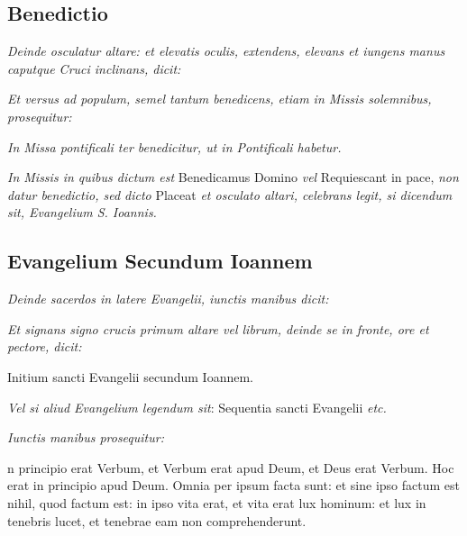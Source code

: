 \subsection{Benedictio}

\textit{%
    Deinde osculatur altare: et elevatis oculis, extendens, elevans et iungens
    manus caputque Cruci inclinans, dicit:
}


\textit{%
    Et versus ad populum, semel tantum benedicens, etiam in Missis solemnibus,
    prosequitur:
}


\divisio

\textit{In Missa pontificali ter benedicitur, ut in Pontificali habetur.}

\textit{In Missis in quibus dictum est} Benedicamus Domino \textit{vel}
Requiescant in pace, \textit{non datur benedictio, sed dicto} Placeat \textit{et
osculato altari, celebrans legit, si dicendum sit, Evangelium S. Ioannis.}

\divisio

\subsection{Evangelium Secundum Ioannem}


\textit{Deinde sacerdos in latere Evangelii, iunctis manibus dicit:}


\textit{%
    Et signans signo crucis primum altare vel librum, deinde se in fronte, ore
    et pectore, dicit:
}

{{\liturgicalfont\fontsize{48}{48}\selectfont\raisebox{-0.3em}{᛭}}}
Initium sancti Evangelii secundum Ioannem.

\textit{Vel si aliud Evangelium legendum sit}: Sequentia sancti Evangelii
\textit{etc.}


\textit{Iunctis manibus prosequitur:}


n principio erat Verbum, et Verbum erat apud Deum, et Deus erat
Verbum.  Hoc erat in principio apud Deum.  Omnia per ipsum facta sunt: et sine
ipso factum est nihil, quod factum est: in ipso vita erat, et vita erat lux
hominum: et lux in tenebris lucet, et tenebrae eam non comprehenderunt.

